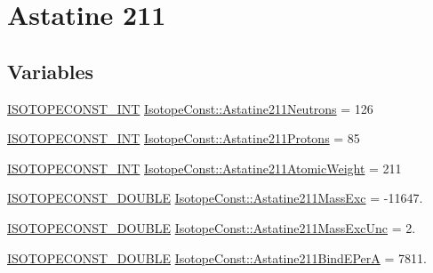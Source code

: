 \hypertarget{group___isotope_const-_astatine-_at211}{}\section{Astatine 211}
\label{group___isotope_const-_astatine-_at211}
\subsection*{Variables}
\begin{DoxyCompactItemize}
\item 
\mbox{\hyperlink{group___isotope_const-_macros_ga5f18360b3e99483a35c32d789e62621c}{I\+S\+O\+T\+O\+P\+E\+C\+O\+N\+S\+T\+\_\+\+I\+NT}} \mbox{\hyperlink{group___isotope_const-_astatine-_at211_gab630fcc97cefcaf9b321e8bcbe703998}{Isotope\+Const\+::\+Astatine211\+Neutrons}} = 126
\item 
\mbox{\hyperlink{group___isotope_const-_macros_ga5f18360b3e99483a35c32d789e62621c}{I\+S\+O\+T\+O\+P\+E\+C\+O\+N\+S\+T\+\_\+\+I\+NT}} \mbox{\hyperlink{group___isotope_const-_astatine-_at211_gaeafbe0ef05905b1779872b256dd90137}{Isotope\+Const\+::\+Astatine211\+Protons}} = 85
\item 
\mbox{\hyperlink{group___isotope_const-_macros_ga5f18360b3e99483a35c32d789e62621c}{I\+S\+O\+T\+O\+P\+E\+C\+O\+N\+S\+T\+\_\+\+I\+NT}} \mbox{\hyperlink{group___isotope_const-_astatine-_at211_gabafa8b19212f84d0f9031eb8c5b8176f}{Isotope\+Const\+::\+Astatine211\+Atomic\+Weight}} = 211
\item 
\mbox{\hyperlink{group___isotope_const-_macros_ga8f45a7272ce02c0b4c65c44636ed719a}{I\+S\+O\+T\+O\+P\+E\+C\+O\+N\+S\+T\+\_\+\+D\+O\+U\+B\+LE}} \mbox{\hyperlink{group___isotope_const-_astatine-_at211_ga8064e0301968d68cf1965459c904f8b3}{Isotope\+Const\+::\+Astatine211\+Mass\+Exc}} = -\/11647.
\item 
\mbox{\hyperlink{group___isotope_const-_macros_ga8f45a7272ce02c0b4c65c44636ed719a}{I\+S\+O\+T\+O\+P\+E\+C\+O\+N\+S\+T\+\_\+\+D\+O\+U\+B\+LE}} \mbox{\hyperlink{group___isotope_const-_astatine-_at211_gaaafedeb794b6a3c28038502ceb1ca722}{Isotope\+Const\+::\+Astatine211\+Mass\+Exc\+Unc}} = 2.
\item 
\mbox{\hyperlink{group___isotope_const-_macros_ga8f45a7272ce02c0b4c65c44636ed719a}{I\+S\+O\+T\+O\+P\+E\+C\+O\+N\+S\+T\+\_\+\+D\+O\+U\+B\+LE}} \mbox{\hyperlink{group___isotope_const-_astatine-_at211_ga692409f3b64fbd737601b989ed50fa75}{Isotope\+Const\+::\+Astatine211\+Bind\+E\+PerA}} = 7811.
\item 

\end{DoxyCompactItemize}

